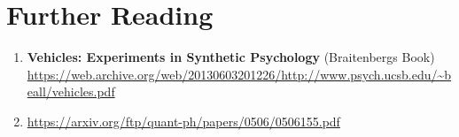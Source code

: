 \section{Further Reading}

\begin{enumerate}

	\item \textbf{Vehicles: Experiments in Synthetic Psychology} (Braitenbergs Book) \url{https://web.archive.org/web/20130603201226/http://www.psych.ucsb.edu/~beall/vehicles.pdf}

	\item \url{https://arxiv.org/ftp/quant-ph/papers/0506/0506155.pdf}

\end{enumerate}
